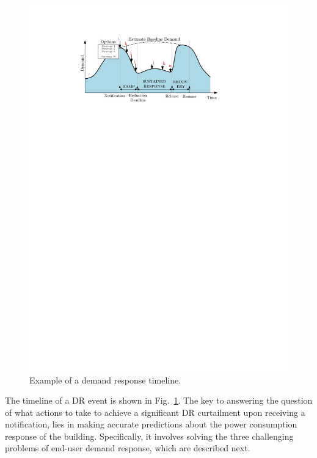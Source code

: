 \begin{figure}
  \centering
  \includegraphics[width=0.75\columnwidth]{figs/problem_description}
  \caption{Example of a demand response timeline.}
  \label{fig:baseline}
\end{figure}

The timeline of a DR event is shown in Fig.~\ref{fig:baseline}.
The key to answering the question of what actions to take to achieve a significant DR curtailment upon receiving a notification, lies in making accurate predictions about the power consumption response of the building. 
Specifically, it involves solving the three challenging problems of end-user demand response, which are described next.


